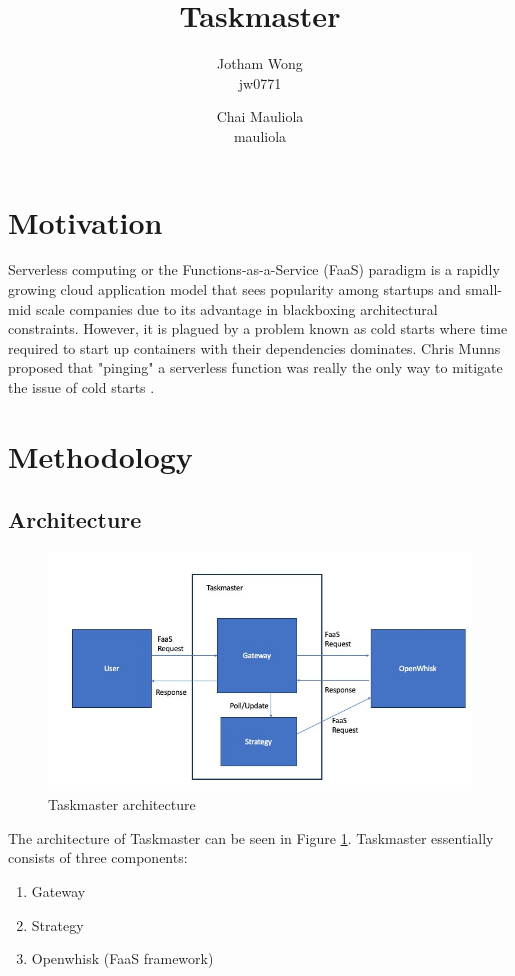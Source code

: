 \documentclass{article}
\title{Taskmaster}
\author{
    Jotham Wong\\
    jw0771\\
    \and
    Chai Mauliola\\
    mauliola
}
\begin{document}
\maketitle

\section{Motivation}

Serverless computing or the Functions-as-a-Service (FaaS) paradigm is a rapidly growing cloud application model that sees popularity among startups and small-mid scale companies due to its advantage in blackboxing architectural constraints. However, it is plagued by a problem known as cold starts where time required to start up containers with their dependencies dominates. Chris Munns proposed that "pinging" a serverless function was really the only way to mitigate the issue of cold starts \cite{jeremydaly}.

\section{Methodology}

\subsection{Architecture}

\begin{figure}
    \begin{center}
        \includegraphics[width=\textwidth]{architecture.jpg}
    \end{center}
    \label{fig:taskmaster}
    \caption{Taskmaster architecture}
\end{figure}

The architecture of Taskmaster can be seen in Figure \ref{fig:taskmaster}. Taskmaster essentially consists of three components: 
\begin{enumerate}
    \item Gateway
    \item Strategy
    \item Openwhisk (FaaS framework)
\end{enumerate}
\end{document}
